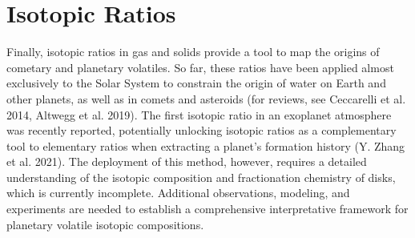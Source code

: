 \section{Isotopic Ratios}
Finally, isotopic ratios in gas and solids provide a tool to map the origins of cometary and planetary volatiles. So far, these ratios have been applied almost exclusively to the Solar System to constrain the origin of water on Earth and other planets, as well as in comets and asteroids (for reviews, see Ceccarelli et al. 2014, Altwegg et al. 2019). The first isotopic ratio in an exoplanet atmosphere was recently reported, potentially unlocking isotopic ratios as a complementary tool to elementary ratios when extracting a planet’s formation history (Y. Zhang et al. 2021). The deployment of this method, however, requires a detailed understanding of the isotopic composition and fractionation chemistry of disks, which is currently incomplete. Additional observations, modeling, and experiments are needed to establish a comprehensive interpretative framework for planetary volatile isotopic compositions.